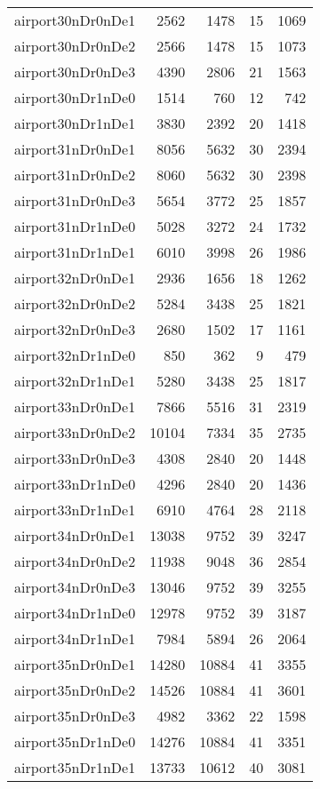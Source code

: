 \begin{longtable}{lrrrr}
airport30nDr0nDe1 & 2562 & 1478 & 15 & 1069 \\
airport30nDr0nDe2 & 2566 & 1478 & 15 & 1073 \\
airport30nDr0nDe3 & 4390 & 2806 & 21 & 1563 \\
airport30nDr1nDe0 & 1514 & 760 & 12 & 742 \\
airport30nDr1nDe1 & 3830 & 2392 & 20 & 1418 \\
airport31nDr0nDe1 & 8056 & 5632 & 30 & 2394 \\
airport31nDr0nDe2 & 8060 & 5632 & 30 & 2398 \\
airport31nDr0nDe3 & 5654 & 3772 & 25 & 1857 \\
airport31nDr1nDe0 & 5028 & 3272 & 24 & 1732 \\
airport31nDr1nDe1 & 6010 & 3998 & 26 & 1986 \\
airport32nDr0nDe1 & 2936 & 1656 & 18 & 1262 \\
airport32nDr0nDe2 & 5284 & 3438 & 25 & 1821 \\
airport32nDr0nDe3 & 2680 & 1502 & 17 & 1161 \\
airport32nDr1nDe0 & 850 & 362 & 9 & 479 \\
airport32nDr1nDe1 & 5280 & 3438 & 25 & 1817 \\
airport33nDr0nDe1 & 7866 & 5516 & 31 & 2319 \\
airport33nDr0nDe2 & 10104 & 7334 & 35 & 2735 \\
airport33nDr0nDe3 & 4308 & 2840 & 20 & 1448 \\
airport33nDr1nDe0 & 4296 & 2840 & 20 & 1436 \\
airport33nDr1nDe1 & 6910 & 4764 & 28 & 2118 \\
airport34nDr0nDe1 & 13038 & 9752 & 39 & 3247 \\
airport34nDr0nDe2 & 11938 & 9048 & 36 & 2854 \\
airport34nDr0nDe3 & 13046 & 9752 & 39 & 3255 \\
airport34nDr1nDe0 & 12978 & 9752 & 39 & 3187 \\
airport34nDr1nDe1 & 7984 & 5894 & 26 & 2064 \\
airport35nDr0nDe1 & 14280 & 10884 & 41 & 3355 \\
airport35nDr0nDe2 & 14526 & 10884 & 41 & 3601 \\
airport35nDr0nDe3 & 4982 & 3362 & 22 & 1598 \\
airport35nDr1nDe0 & 14276 & 10884 & 41 & 3351 \\
airport35nDr1nDe1 & 13733 & 10612 & 40 & 3081 \\

\end{longtable}
